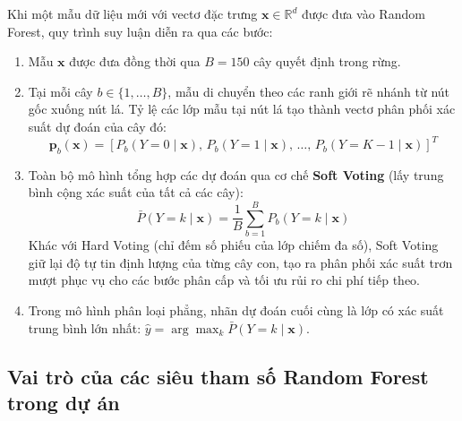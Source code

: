 Khi một mẫu dữ liệu mới với vectơ đặc trưng $\mathbf{x} \in \mathbb{R}^d$ được đưa vào Random Forest, quy trình suy luận diễn ra qua các bước:
\begin{enumerate}
    \item Mẫu $\mathbf{x}$ được đưa đồng thời qua $B = 150$ cây quyết định trong rừng.
    \item Tại mỗi cây $b \in \{1, \dots, B\}$, mẫu di chuyển theo các ranh giới rẽ nhánh từ nút gốc xuống nút lá. Tỷ lệ các lớp mẫu tại nút lá tạo thành vectơ phân phối xác suất dự đoán của cây đó:
    \begin{equation}
        \mathbf{p}_b(\mathbf{x}) = \left[ P_b(Y = 0 \mid \mathbf{x}), \, P_b(Y = 1 \mid \mathbf{x}), \, \dots, \, P_b(Y = K-1 \mid \mathbf{x}) \right]^T
    \end{equation}
    \item Toàn bộ mô hình tổng hợp các dự đoán qua cơ chế \textbf{Soft Voting} (lấy trung bình cộng xác suất của tất cả các cây):
    \begin{equation}
        \bar{P}(Y = k \mid \mathbf{x}) = \frac{1}{B} \sum_{b=1}^B P_b(Y = k \mid \mathbf{x})
    \end{equation}
    Khác với Hard Voting (chỉ đếm số phiếu của lớp chiếm đa số), Soft Voting giữ lại độ tự tin định lượng của từng cây con, tạo ra phân phối xác suất trơn mượt phục vụ cho các bước phân cấp và tối ưu rủi ro chi phí tiếp theo.
    \item Trong mô hình phân loại phẳng, nhãn dự đoán cuối cùng là lớp có xác suất trung bình lớn nhất: $\hat{y} = \arg\max_k \bar{P}(Y = k \mid \mathbf{x})$.
\end{enumerate}

\subsection{Vai trò của các siêu tham số Random Forest trong dự án}
\label{subsec:rf-hyperparameters-role}

